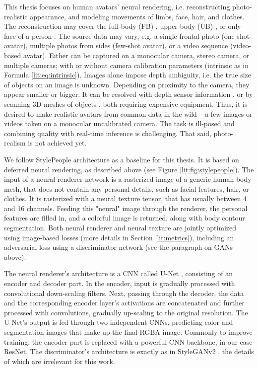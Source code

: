 This thesis focuses on human avatars' neural rendering, i.e. reconstructing photo-realistic appearance, and modeling movements of limbs, face, hair, and clothes. The reconstruction may cover the full-body (FB)  \cite{dnn:fb-cloth-avatar21, dnn:stylepeople21, dnn:anr21}, upper-body (UB) \cite{dnn:upper-avatar21}, or only face of a person \cite{dnn:volumetric-primitives21, dnn:hyperstyle21}. The source data may vary, e.g. a single frontal photo (one-shot avatar), multiple photos from sides (few-shot avatar), or a video sequence (video-based avatar). Either can be captured on a monocular camera\cite{dnn:stylepeople21}, stereo camera\cite{dnn:stereo-avatars11}, or multiple cameras\cite{dnn:volumetric-primitives21, dnn:textured-avatars19}; with or without camera calibration parameters (intrinsic as in Formula \ref{lit:eq:intrinsic}). Images alone impose depth ambiguity, i.e. the true size of objects on an image is unknown. Depending on proximity to the camera, they appear smaller or bigger. It can be resolved with depth sensor information \cite{dnn:depth-avatar11}, or by scanning 3D meshes of objects \cite{dnn:phorhum22}, both requiring expensive equipment. Thus, it is desired to make realistic avatars from common data in the wild -- a few images or videos taken on a monocular uncalibrated camera. The task is ill-posed and combining quality with real-time inference is challenging. That said, photo-realism is not achieved yet. 

We follow StylePeople \cite{dnn:stylepeople21} architecture as a baseline for this thesis. It is based on deferred neural rendering, as described above (see Figure \ref{lit:fig:stylepeople}). The input of a neural renderer network is a rasterized image of a generic human body mesh, that does not contain any personal details, such as facial features, hair, or clothes. It is rasterized with a neural texture tensor, that has usually between 4 and 16 channels. Feeding this "neural" image through the renderer, the personal features are filled in, and a colorful image is returned, along with body contour segmentation. Both neural renderer and neural texture are jointly optimized using image-based losses (more details in Section \ref{lit:metrics}), including an adversarial loss using a discriminator network (see the paragraph on GANs above). 

The neural renderer's architecture is a CNN called U-Net \cite{dnn:unet15}, consisting of an encoder and decoder part. In the encoder, input is gradually processed with convolutional down-scaling filters. Next, passing through the decoder, the data and the corresponding encoder layer's activations are concatenated and further processed with convolutions, gradually up-scaling to the original resolution. The U-Net's output is fed through two independent CNNs, predicting color and segmentation images that make up the final RGBA image. Commonly to improve training, the encoder part is replaced with a powerful CNN backbone, in our case ResNet\cite{dnn:resnet-unet20,dnn:resnet16}. The discriminator's architecture is exactly as in StyleGANv2 \cite{dnn:stylegan-v2-20}, the details of which are irrelevant for this work.

